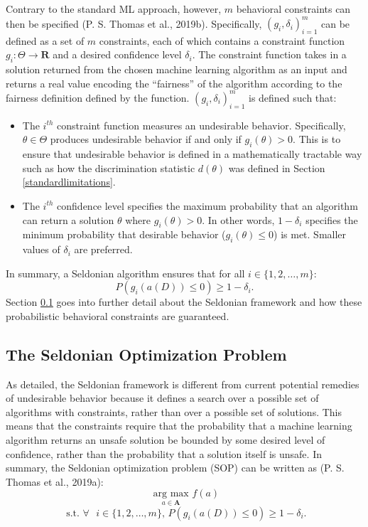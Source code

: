 \documentclass[12pt, twoside]{amherstthesis}
\begin{document}
Contrary to the standard ML approach, however, \(m\) behavioral constraints can then be specified (P. S. Thomas et al., 2019b). Specifically, \((g_i, \delta_i)_{i=1}^{m}\) can be defined as a set of \(m\) constraints, each of which contains a constraint function \(g_i: \Theta \rightarrow \textbf{R}\) and a desired confidence level \(\delta_i\). The constraint function takes in a solution returned from the chosen machine learning algorithm as an input and returns a real value encoding the ``fairness'' of the algorithm according to the fairness definition defined by the function. \((g_i, \delta_i)_{i=1}^{m}\) is defined such that:
\begin{itemize}
\item
  The \(i^{th}\) constraint function measures an undesirable behavior. Specifically, \(\theta \in \Theta\) produces undesirable behavior if and only if \(g_i(\theta) > 0\). This is to ensure that undesirable behavior is defined in a mathematically tractable way such as how the discrimination statistic \(d(\theta)\) was defined in Section \ref{standardlimitations}.
\item
  The \(i^{th}\) confidence level specifies the maximum probability that an algorithm can return a solution \(\theta\) where \(g_i(\theta) > 0\). In other words, \(1 - \delta_i\) specifies the minimum probability that desirable behavior (\(g_i(\theta) \leq 0\)) is met. Smaller values of \(\delta_i\) are preferred.
\end{itemize}
In summary, a Seldonian algorithm ensures that for all \(i \in \{1,2,\ldots,m\}\):
\begin{equation}
\label{ch2eq6}
P(g_i(a(D)) \leq 0) \geq 1 - \delta_i.
\end{equation}
Section \ref{sop} goes into further detail about the Seldonian framework and how these probabilistic behavioral constraints are guaranteed.

\hypertarget{sop}{%
\subsection{The Seldonian Optimization Problem}\label{sop}}

As detailed, the Seldonian framework is different from current potential remedies of undesirable behavior because it defines a search over a possible set of algorithms with constraints, rather than over a possible set of solutions. This means that the constraints require that the probability that a machine learning algorithm returns an unsafe solution be bounded by some desired level of confidence, rather than the probability that a solution itself is unsafe. In summary, the Seldonian optimization problem (SOP) can be written as (P. S. Thomas et al., 2019a):
\begin{equation}
\label{ch2eq7}
\underset{a \in \textbf{A}}{\text{ arg max }} f(a)
\end{equation}
\[\text{ s.t. } \forall \text{ } i \in \{1, 2, \ldots, m\} \text{, } P(g_i(a(D)) \leq 0) \geq 1 - \delta_i.\]
\end{document}
